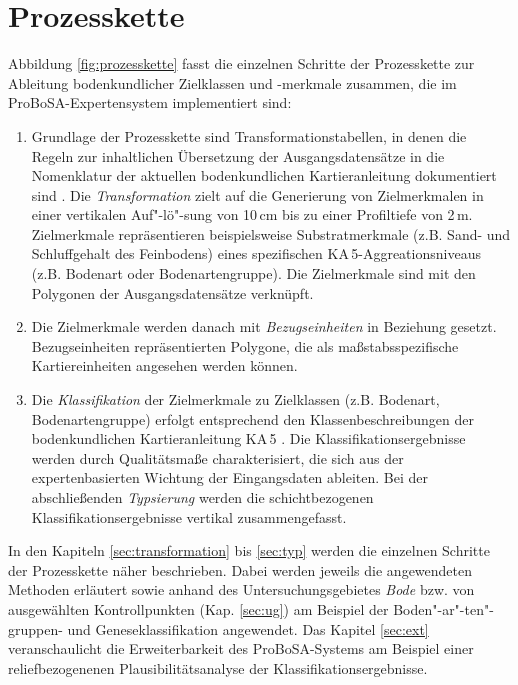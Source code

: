 \section{Prozesskette}\label{sec:prozesskette}
Abbildung \ref{fig:prozesskette} fasst die  einzelnen Schritte der Prozesskette zur Ableitung bodenkundlicher Zielklassen und -merkmale zusammen, die im ProBoSA-Expertensystem implementiert sind:

\begin{enumerate}
	\item Grundlage der Prozesskette sind Transformationstabellen, in denen die Regeln zur inhaltlichen Übersetzung  der Ausgangsdatensätze in die Nomenklatur der aktuellen bodenkundlichen Kartieranleitung dokumentiert sind \citep{KA5}. Die \textit{Transformation} zielt auf die Generierung von Zielmerkmalen in einer vertikalen Auf"-lö"-sung von 10\,cm bis zu einer Profiltiefe von 2\,m. Zielmerkmale repräsentieren beispielsweise Substratmerkmale (z.B. Sand- und Schluffgehalt des Feinbodens) eines spezifischen KA\,5-Aggreationsniveaus (z.B. Bodenart oder Bodenartengruppe). Die Zielmerkmale sind mit den Polygonen der Ausgangsdatensätze verknüpft.
	\item Die Zielmerkmale werden danach mit \textit{Bezugseinheiten} in Beziehung gesetzt. Bezugseinheiten repräsentierten Polygone, die als maßstabsspezifische Kartiereinheiten angesehen werden können.
	\item Die \textit{Klassifikation} der Zielmerkmale zu Zielklassen (z.B. Bodenart, Bodenartengruppe) erfolgt entsprechend den Klassenbeschreibungen der bodenkundlichen Kartieranleitung KA\,5 \citep{KA5}. Die  Klassifikationsergebnisse werden durch Qualitätsmaße charakterisiert, die sich aus der expertenbasierten Wichtung der Eingangsdaten  ableiten. Bei der abschließenden \textit{Typsierung} werden die schichtbezogenen Klassifikationsergebnisse vertikal zusammengefasst.
\end{enumerate}
	
In den Kapiteln \ref{sec:transformation} bis \ref{sec:typ} werden die einzelnen Schritte der Prozesskette näher beschrieben. Dabei werden jeweils die angewendeten Methoden erläutert sowie anhand des Untersuchungsgebietes \textit{Bode} bzw. von ausgewählten Kontrollpunkten (Kap. \ref{sec:ug}) am Beispiel der Boden"-ar"-ten"-gruppen- und Geneseklassifikation angewendet. Das Kapitel \ref{sec:ext} veranschaulicht die Erweiterbarkeit des ProBoSA-Systems am Beispiel einer reliefbezogenenen Plausibilitätsanalyse der Klassifikationsergebnisse. 

